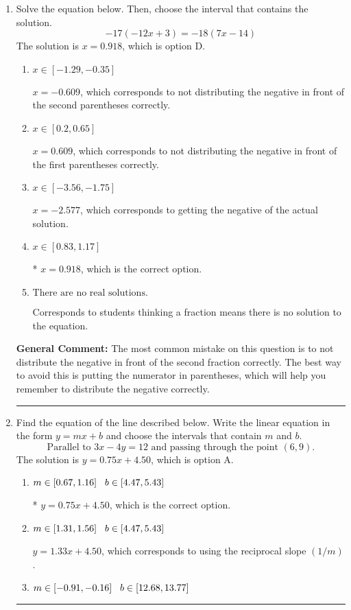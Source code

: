 \documentclass{extbook}[14pt]
\newcommand{\litem}[1]{\item #1

\rule{\textwidth}{0.4pt}}
\begin{document}
\begin{enumerate}\litem{
Solve the equation below. Then, choose the interval that contains the solution.
\[ -17(-12x + 3) = -18(7x -14) \]The solution is \( x = 0.918 \), which is option D.\begin{enumerate}[label=\Alph*.]
\item \( x \in [-1.29, -0.35] \)

$x = -0.609$, which corresponds to not distributing the negative in front of the second parentheses correctly.
\item \( x \in [0.2, 0.65] \)

$x = 0.609$, which corresponds to not distributing the negative in front of the first parentheses correctly.
\item \( x \in [-3.56, -1.75] \)

$x = -2.577$, which corresponds to getting the negative of the actual solution.
\item \( x \in [0.83, 1.17] \)

* $x = 0.918$, which is the correct option.
\item \( \text{There are no real solutions.} \)

Corresponds to students thinking a fraction means there is no solution to the equation.
\end{enumerate}

\textbf{General Comment:} The most common mistake on this question is to not distribute the negative in front of the second fraction correctly. The best way to avoid this is putting the numerator in parentheses, which will help you remember to distribute the negative correctly.
}
\litem{
Find the equation of the line described below. Write the linear equation in the form $ y=mx+b $ and choose the intervals that contain $m$ and $b$.
\[ \text{Parallel to } 3 x - 4 y = 12 \text{ and passing through the point } (6, 9). \]The solution is \( y = 0.75x + 4.50 \), which is option A.\begin{enumerate}[label=\Alph*.]
\item \( m \in [0.67, 1.16] \hspace*{3mm} b \in [4.47, 5.43] \)

* $y = 0.75x + 4.50$, which is the correct option.
\item \( m \in [1.31, 1.56] \hspace*{3mm} b \in [4.47, 5.43] \)

 $y = 1.33x + 4.50$, which corresponds to using the reciprocal slope $(1/m)$.
\item \( m \in [-0.91, -0.16] \hspace*{3mm} b \in [12.68, 13.77] \)


\end{enumerate}}
\end{enumerate}
\end{document}
